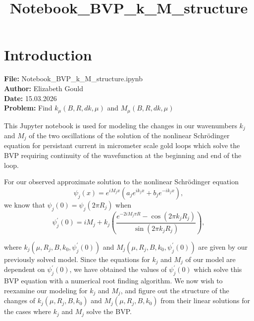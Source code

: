\documentclass[11pt]{article}
\title{Notebook\_BVP\_k\_M\_structure}
\begin{document}
    
    \maketitle
    
    

    
    \hypertarget{introduction}{%
\section{Introduction}\label{introduction}}

    \textbf{File:} Notebook\_BVP\_k\_M\_structure.ipynb\\
\textbf{Author:} Elizabeth Gould\\
\textbf{Date:} 15.03.2026\\
\textbf{Problem:} Find \(k_{\mu}\left(B, R, dk, \mu\right)\) and
\(M_{\mu}\left(B, R, dk, \mu\right)\)

    This Jupyter notebook is used for modeling the changes in our
wavenumbers \(k_j\) and \(M_j\) of the two oscillations of the solution
of the nonlinear Schrödinger equation for persistant current in
micrometer scale gold loops which solve the BVP requiring continuity of
the wavefunction at the beginning and end of the loop.

For our observed approximate solution to the nonlinear Schrödinger
equation \begin{equation}
\psi_j(x) = e^{i M_{j} x} \left( a_j e^{i k_{j} x} + b_j e^{- i k_{j} x} \right),
\end{equation} we know that \(\psi_j(0) = \psi_j(2\pi R_j)\) when
\begin{equation}
\psi_j^\prime(0) = i M_{j} + k_j \left( \frac{e^{- 2 i M_{j}\pi R} - \cos\left( 2\pi k_{j} R_j \right)}{\sin\left(2\pi k_{j} R_j\right)}\right),
\end{equation}

where \(k_{j}\left(\mu, R_j, B, k_0, \psi_j^\prime(0) \right)\) and
\(M_{j}\left(\mu, R_j, B, k_0, \psi_j^\prime(0) \right)\) are given by
our previously solved model. Since the equations for \(k_j\) and \(M_j\)
of our model are dependent on \(\psi_j^\prime(0)\), we have obtained the
values of \(\psi_j^\prime(0)\) which solve this BVP equation with a
numerical root finding algorithm. We now wish to reexamine our modeling
for \(k_j\) and \(M_j\), and figure out the structure of the changes of
\(k_{j}\left(\mu, R_j, B, k_0 \right)\) and
\(M_{j}\left(\mu, R_j, B, k_0\right)\) from their linear solutions for
the cases where \(k_j\) and \(M_j\) solve the BVP.
\end{document}
